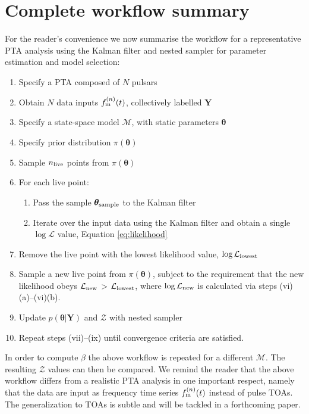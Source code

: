 \documentclass[fleqn,usenatbib,useAMS]{mnras}
\begin{document}
\section{Complete workflow summary}
For the reader's convenience we now summarise the workflow for a representative PTA analysis using the Kalman filter and nested sampler for parameter estimation and model selection:
\begin{enumerate}[leftmargin=2em]
	\item Specify a PTA composed of $N$ pulsars 
	\item Obtain $N$ data inputs $f_{\rm m}^{(n)}(t)$, collectively labelled $\boldsymbol{Y}$
	\item Specify a state-space model $\mathcal{M}$, with static parameters $\boldsymbol{\theta}$
	\item Specify prior distribution $\pi(\boldsymbol{\theta})$
	\item Sample $n_{\rm live}$ points from $\pi(\boldsymbol{\theta})$ 
	\item For each live point:
	\begin{enumerate}[leftmargin=2em]
		\item Pass the sample $\boldsymbol{\theta}_{\rm sample}$ to the Kalman filter
		\item Iterate over the input data using the Kalman filter and obtain a single $\log \mathcal{L}$ value, Equation \eqref{eq:likelihood}
	\end{enumerate}
	\item Remove the live point with the lowest likelihood value, $\log \mathcal{L}_{\rm lowest}$
	\item Sample a new live point from $\pi(\boldsymbol{\theta})$, subject to the requirement that the new likelihood obeys $\mathcal{L}_{\rm new}$ > $\mathcal{L}_{\rm lowest}$, where $\log \mathcal{L}_{\rm new}$ is calculated via steps (vi)(a)--(vi)(b).
	\item Update $p\left(\boldsymbol{\theta}|\boldsymbol{Y}\right)$ and $\mathcal{Z}$ with nested sampler
	\item Repeat steps (vii)--(ix) until convergence criteria are satisfied.
\end{enumerate}
In order to compute $\beta$ the above workflow is repeated for a different $\mathcal{M}$. The resulting $\mathcal{Z}$ values can then be compared. We remind the reader that the above workflow differs from a realistic PTA analysis in one important respect, namely that the data are input as frequency time series $f_{\rm m}^{(n)}(t)$ instead of pulse TOAs. The generalization to TOAs is subtle and will be tackled in a forthcoming paper.
\end{document}
